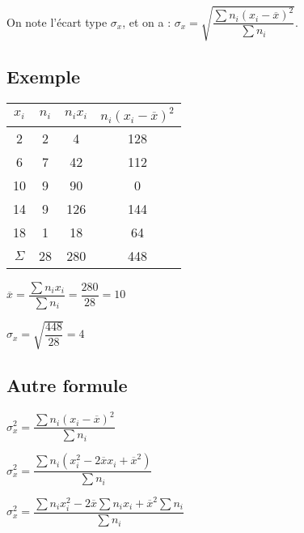On note l'écart type $\sigma_x$, et on a : $ \sigma_x = \sqrt{\dfrac{\displaystyle{\sum n_i}\left(x_i - \overline{x}\right)^2}{\displaystyle{\sum n_i}}} $.

\subsection{Exemple}

\begin{tabular}{c|c|c|c}
$x_i$ & $n_i$ & $n_ix_i$ & $n_i\left(x_i - \overline{x}\right)^2$ \\
\hline
2 & 2 & 4 & 128 	\\
6 & 7 & 42 & 112 \\
10 & 9 & 90 & 0 \\
14 & 9 & 126 & 144 \\
18 & 1 & 18 & 64 \\
\hline
$\Sigma$ & 28 & 280 & 448 \\
\end{tabular}

\vspace*{.3cm}

$ \overline{x} = \dfrac{\displaystyle{\sum n_ix_i}}{\displaystyle{\sum n_i}} = \dfrac{280}{28} = 10 $ \\

\vspace*{.3cm}

$\sigma_x = \sqrt{\dfrac{448}{28}} = 4 $

\newpage

\vspace*{-2cm}

\subsection{Autre formule}

$ \sigma_x^2 = \dfrac{\displaystyle{\sum n_i \left(x_i - \overline{x}\right)^2}}{\displaystyle{\sum n_i}} $ \\

\vspace*{.5cm}

$ \sigma_x^2 = \dfrac{\displaystyle{\sum n_i\left(x_i^2 - 2\overline{x}x_i + \overline{x}^2\right)}}{\displaystyle{\sum n_i}} $ \\

\vspace*{.5cm}

$ \sigma_x^2 = \dfrac{\displaystyle{\sum n_ix_i^2} - 2\overline{x}\displaystyle{\sum n_ix_i} + \overline{x}^2\displaystyle{\sum n_i}}{\displaystyle{\sum n_i}} $ \\

